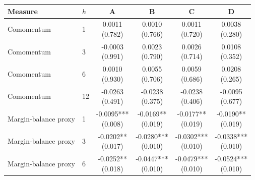 \begingroup\small\setlength{\tabcolsep}{2.5pt}
\begin{tabular}{llcccc}
\toprule
Measure & $h$ & A & B & C & D \\
\midrule
Comomentum & 1 & \shortstack{0.0011\\(0.782)} & \shortstack{0.0010\\(0.766)} & \shortstack{0.0011\\(0.720)} & \shortstack{0.0038\\(0.280)} \\
Comomentum & 3 & \shortstack{-0.0003\\(0.991)} & \shortstack{0.0023\\(0.790)} & \shortstack{0.0026\\(0.714)} & \shortstack{0.0108\\(0.352)} \\
Comomentum & 6 & \shortstack{0.0010\\(0.930)} & \shortstack{0.0055\\(0.706)} & \shortstack{0.0059\\(0.686)} & \shortstack{0.0208\\(0.265)} \\
Comomentum & 12 & \shortstack{-0.0263\\(0.491)} & \shortstack{-0.0238\\(0.375)} & \shortstack{-0.0238\\(0.406)} & \shortstack{-0.0095\\(0.677)} \\
Margin-balance proxy & 1 & \shortstack{-0.0095***\\(0.008)} & \shortstack{-0.0169**\\(0.019)} & \shortstack{-0.0177**\\(0.019)} & \shortstack{-0.0190**\\(0.019)} \\
Margin-balance proxy & 3 & \shortstack{-0.0202**\\(0.017)} & \shortstack{-0.0280***\\(0.010)} & \shortstack{-0.0302***\\(0.010)} & \shortstack{-0.0338***\\(0.010)} \\
Margin-balance proxy & 6 & \shortstack{-0.0252**\\(0.018)} & \shortstack{-0.0447***\\(0.010)} & \shortstack{-0.0479***\\(0.010)} & \shortstack{-0.0524***\\(0.010)} \\

\end{tabular}
